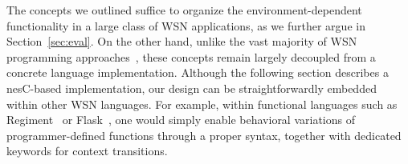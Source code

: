 The concepts we outlined suffice to organize the environment-dependent
functionality in a large class of WSN applications, as we further
argue in Section~\ref{sec:eval}. On the other hand, unlike the vast
majority of WSN programming approaches~\cite{mottola10:survey}, these
concepts remain largely decoupled from a concrete language
implementation. Although the following section describes a nesC-based
implementation, our design can be straightforwardly embedded within
other WSN languages. For example, within functional languages such as
Regiment~\cite{Newton:2007:RMS:1236360.1236422} or
Flask~\cite{Mainland:2008:FSF:1411204.1411251}, one would simply
enable behavioral variations of programmer-defined functions through a
proper syntax, together with dedicated keywords for context
transitions.





